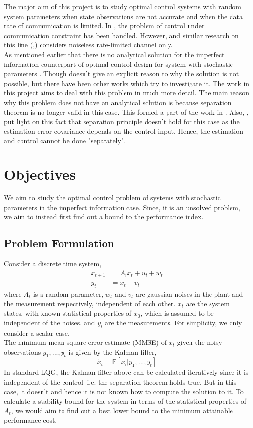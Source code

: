 \documentclass[12pt]{caltech_thesis_progress1}
\begin{document}
The major aim of this project is to study optimal control systems with random system parameters when state observations are not accurate and when the data rate of communication is limited. In \cite{tatikonda}, the problem of control under communication constraint has been handled. However, \cite{tatikonda} and similar research on this line (\cite{rate1},\cite{rate2}) considers noiseless rate-limited channel only.\\
	As mentioned earlier that there is no analytical solution for the imperfect information counterpart of optimal control design for system with stochastic parameters \cite{berstekas}. Though \cite{berstekas} doesn't give an explicit reason to why the solution is not possible, but there have been other works which try to investigate it. The work in this project aims to deal with this problem in much more detail. The main reason why this problem does not have an analytical solution is because separation theorem is no longer valid in this case. This formed a part of the work in \cite{samir}. Also, \cite{schenatto}, put light on this fact that separation principle doesn't hold for this case as the estimation error covariance depends on the control input. Hence, the estimation and control cannot be done "separately". 
\chapter{Objectives}
We aim to study the optimal control problem of systems with stochastic parameters in the imperfect information case. Since, it is an unsolved problem, we aim to instead first find out a bound to the performance index. 
	\section{Problem Formulation}
	\label{problem}
		Consider a discrete time system,
			\begin{align}
			\label{system}
				x_{t+1}&=A_{t}x_{t} + u_{t} + w_{t}\\
				y_{t}&=x_{t}+v_{t}
			\end{align}
			where $A_{t}$ is a random parameter, $w_{t}$ and $v_{t}$ are gaussian noises in the plant and the measurement respectively, independent of each other. $x_{t}$ are the system states, with known statistical properties of $x_{0}$, which is assumed to be independent of the noises. and $y_{t}$ are the measurements. For simplicity, we only consider a scalar case.\\
			The minimum mean square error estimate (MMSE) of $x_{t}$ given the noisy observations $y_{1},...,y_{t}$ is given by the Kalman filter,
			\begin{equation}
			\tilde{x}_{t} =\mathbb{E}\left[x_{t} | y_{1},...,y_{t}\right]
\end{equation}			 
In standard LQG, the Kalman filter above can be calculated iteratively since it is independent of the control, i.e. the separation theorem holds true. But in this case, it doesn't and hence it is not known how to compute the solution to it. To calculate a stability bound for the system in terms of the statistical properties of $A_{t}$, we would aim to find out a best lower bound to the minimum attainable performance cost.  
\end{document}
